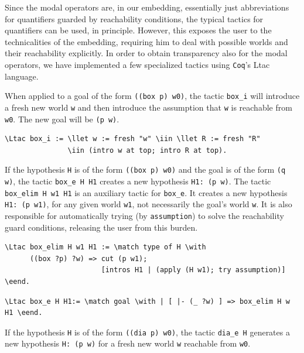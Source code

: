 \documentclass{llncs}
\newcommand{\red}[1]{\textcolor[rgb]{1,0,0}{#1}}
\newcommand{\blue}[1]{\textcolor[rgb]{0,0,1}{#1}}
\newcommand{\Ltac}{\red{Ltac}}
\newcommand{\llet}{\blue{let}}
\newcommand{\match}{\blue{match}}
\newcommand{\with}{\blue{with}}
\newcommand{\eend}{\blue{end}}
\newcommand{\iin}{\blue{in}}
\newcommand{\Coq}{\texttt{Coq}\xspace}
\begin{document}
Since the modal operators are, in our embedding, essentially just
abbreviations for quantifiers guarded by reachability conditions, the
typical tactics for quantifiers can be used, in principle.  However,
this exposes the user to the technicalities of the embedding,
requiring him to deal with possible worlds and their reachability
explicitly. In order to obtain transparency also for the modal
operators, we have implemented a few specialized tactics using \Coq's
Ltac language.

When applied to a goal of the form \texttt{((box p) w0)}, the tactic
\texttt{box\_i} will introduce a fresh new world \texttt{w} and then
introduce the assumption that \texttt{w} is reachable from
\texttt{w0}. The new goal will be \texttt{(p w)}.

\begin{Verbatim}[commandchars=\\\{\},fontsize=\verbsize]
\Ltac box_i := \llet w := fresh "w" \iin \llet R := fresh "R" 
               \iin (intro w at top; intro R at top).
\end{Verbatim}

\noindent 
If the hypothesis \texttt{H} is of the form \texttt{((box p)
w0)} and the goal is of the form \texttt{(q w)}, the tactic
\texttt{box\_e H H1} creates a new hypothesis \texttt{H1: (p w)}. The
tactic \texttt{box\_elim H w1 H1} is an auxiliary tactic for
\texttt{box\_e}. It creates a new hypothesis \texttt{H1: (p w1)}, for
any given world \texttt{w1}, not necessarily the goal's world
\texttt{w}. It is also responsible for automatically trying (by
\texttt{assumption}) to solve the reachability guard conditions,
releasing the user from this burden.

\begin{Verbatim}[commandchars=\\\{\},fontsize=\verbsize]
\Ltac box_elim H w1 H1 := \match type of H \with 
      ((box ?p) ?w) => cut (p w1); 
                       [intros H1 | (apply (H w1); try assumption)] \eend.
\end{Verbatim}

\begin{Verbatim}[commandchars=\\\{\},fontsize=\verbsize]
\Ltac box_e H H1:= \match goal \with | [ |- (_ ?w) ] => box_elim H w H1 \eend.
\end{Verbatim}

\noindent 
If the hypothesis \texttt{H} is of the form \texttt{((dia p)
w0)}, the tactic \texttt{dia\_e H} generates a new hypothesis
\texttt{H: (p w)} for a fresh new world \texttt{w} reachable from
\texttt{w0}.
\end{document}
